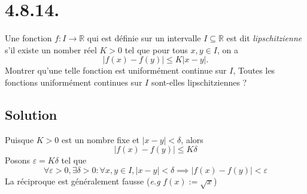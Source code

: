 \section*{4.8.14.}
	Une fonction $f:I\longrightarrow\mathbb{R}$ qui est définie sur un intervalle $I\subseteq\mathbb{R}$ est dit \textit{lipschitzienne} s'il existe un nomber réel $K>0$ tel que pour tous $x,y\in I$, on a\[|f(x)-f(y)|\leq K|x-y|.\]
	Montrer qu'une telle fonction est uniformément continue sur $I$, Toutes les fonctions uniformément continues sur $I$ sont-elles lipschitziennes ?
	\subsection*{Solution}
	Puisque $K>0$ est un nombre fixe et $|x-y|<\delta$, alors
	\[|f(x)-f(y)|\leq K\delta\]
	Posons $\varepsilon=K\delta$ tel que
	\[\forall \varepsilon>0,\exists\delta>0 : \forall x,y\in I, |x-y|<\delta \implies |f(x)-f(y)|<\varepsilon\]
	La réciproque est généralement fausse (\textit{e.g} $f(x):=\sqrt{x}$)